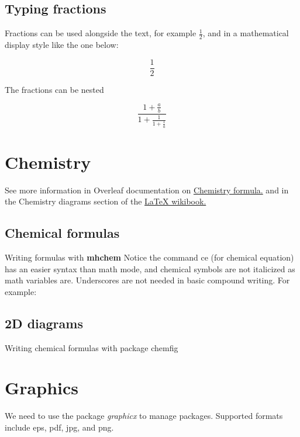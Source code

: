 \documentclass{article}
\begin{document}
\subsection{Typing fractions}
Fractions can be used alongside the text, for 
example \( \frac{1}{2} \), and in a mathematical 
display style like the one below:

\[\frac{1}{2}\]

The fractions can be nested

\[ \frac{1+\frac{a}{b}}{1+\frac{1}{1+\frac{1}{a}}} \]


\section{Chemistry}
See more information in Overleaf documentation on \href{https://www.overleaf.com/learn/latex/Chemistry_formulae}{Chemistry formula.} and in the Chemistry diagrams section of the \href{https://en.wikibooks.org/wiki/LaTeX/Chemical_Graphics}{LaTeX wikibook.}

\subsection{Chemical formulas}

Writing formulas with \textbf{mhchem}
Notice the command ce (for chemical equation) has an easier syntax than math mode, and chemical symbols are not italicized as math variables are.  Underscores are not needed in basic compound writing. For example:







\subsection{2D diagrams}
Writing chemical formulas with package chemfig





\section{Graphics}
We need to use the package \textit{graphicx} to manage packages.  Supported formats include eps, pdf, jpg, and png.  
\end{document}
